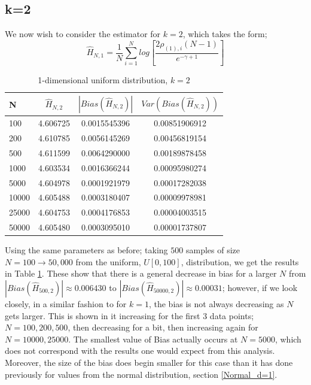 \documentclass{report}
\begin{document}
\subsection{k=2} \label{U_k=2}
We now wish to consider the estimator for $k=2$, which takes the form;
\begin{equation} 
\hat{H}_{N, 1} = \frac{1}{N} \sum_{i=1}^{N} log \left[ \frac{2\rho_{(1),i} (N-1)}{e^{-\gamma + 1}} \right] \nonumber
\end{equation}

\begin{table}
\caption{1-dimensional uniform distribution, $k=2$} \label{uniform_k=2_table}
\begin{center}
\begin{tabular}{| l | c c c|} 
\toprule
N & $\hat{H}_{N, 2}$ & $|Bias(\hat{H}_{N, 2})|$ & $Var(Bias(\hat{H}_{N, 2}))$ \\
\midrule[1pt]
100     & 4.606725     & 0.0015545396     & 0.00851906912  \\
200     & 4.610785     & 0.0056145269     & 0.00456819154  \\
500     & 4.611599     & 0.0064290000     & 0.00189878458  \\
1000    & 4.603534     & 0.0016366244     & 0.00095980274  \\
5000    & 4.604978     & 0.0001921979     & 0.00017282038  \\
10000   & 4.605488     & 0.0003180407     & 0.00009978981  \\
25000   & 4.604753     & 0.0004176853     & 0.00004003515  \\
50000   & 4.605480     & 0.0003095010     & 0.00001737807  \\
\hline
\end{tabular}
\end{center}
\end{table}

Using the same parameters as before; taking $500$ samples of size $N=100 \to 50,000$ from the uniform, $U[0, 100]$, distribution, we get the results in Table \ref{uniform_k=2_table}. These show that there is a general decrease in bias for a larger $N$ from $|Bias(\hat{H}_{500, 2})| \approx  0.006430$ to $|Bias(\hat{H}_{50000, 2})| \approx 0.00031$; however, if we look closely, in a similar fashion to for $k=1$, the bias is not always decreasing as $N$ gets larger. This is shown in it increasing for the first 3 data points; $N=100, 200 ,500$, then decreasing for a bit, then increasing again for $N = 10000, 25000$. The smallest value of Bias actually occurs at $N=5000$, which does not correspond with the results one would expect from this analysis. Moreover, the size of the bias does begin smaller for this case than it has done previously for values from the normal distribution, section \ref{Normal_d=1}. 
\end{document}
